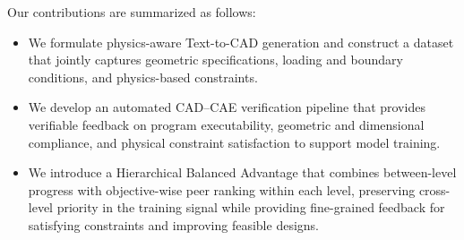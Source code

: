 Our contributions are summarized as follows:
\begin{itemize}
[leftmargin=*, itemsep=0.15em, topsep=0.1em, parsep=0pt, partopsep=0pt]
\item We formulate physics-aware Text-to-CAD generation and construct a dataset that jointly captures geometric specifications, loading and boundary conditions, and physics-based constraints.
\item We develop an automated CAD--CAE verification pipeline that provides verifiable feedback on program executability, geometric and dimensional compliance, and physical constraint satisfaction to support model training.
\item We introduce a Hierarchical Balanced Advantage that combines between-level progress with objective-wise peer ranking within each level, preserving cross-level priority in the training signal while providing fine-grained feedback for satisfying constraints and improving feasible designs.
\end{itemize}





